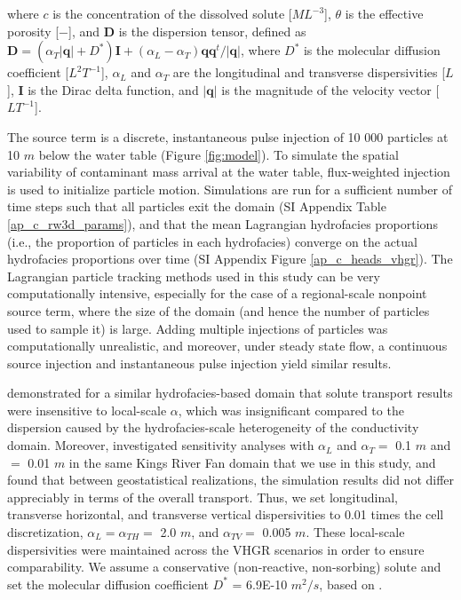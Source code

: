 where $c$ is the concentration of the dissolved solute [$ML^{-3}$], $\theta$ is the effective porosity [$-$], and $\textbf{D}$ is the dispersion tensor, defined as $\textbf{D} = (\alpha_T |\textbf{q}| + D^*) \textbf{I} + (\alpha_L - \alpha_T) \textbf{qq}^t / |\textbf{q}|$, where $D^*$ is the molecular diffusion coefficient [$L^2 T^{-1}$], $\alpha_L$ and $\alpha_T$ are the longitudinal and transverse dispersivities [$L$], $\textbf{I}$ is the Dirac delta function, and $|\textbf{q}|$ is the magnitude of the velocity vector [$LT^{-1}$].

The source term is a discrete, instantaneous pulse injection of 10 000 particles at 10 $m$ below the water table (Figure \ref{fig:model}). To simulate the spatial variability of contaminant mass arrival at the water table, flux-weighted injection is used to initialize particle motion. Simulations are run for a sufficient number of time steps such that all particles exit the domain (SI Appendix Table \ref{ap_c_rw3d_params}), and that the mean Lagrangian hydrofacies proportions (i.e., the proportion of particles in each hydrofacies) converge on the actual hydrofacies proportions over time (SI Appendix Figure \ref{ap_c_heads_vhgr}). The Lagrangian particle tracking methods used in this study can be very computationally intensive, especially for the case of a regional-scale nonpoint source term, where the size of the domain (and hence the number of particles used to sample it) is large. Adding multiple injections of particles was computationally unrealistic, and moreover, under steady state flow, a continuous source injection and instantaneous pulse injection yield similar results. %

\citet{labolle2001role} demonstrated for a similar hydrofacies-based domain that solute transport results were insensitive to local-scale $\alpha$, which was insignificant compared to the dispersion caused by the hydrofacies-scale heterogeneity of the conductivity domain. Moreover, \citet{weissmann2002dispersion} investigated sensitivity analyses with $\alpha_L$ and $\alpha_T =$ 0.1 $m$ and $=$ 0.01 $m$ in the same Kings River Fan domain that we use in this study, and found that between geostatistical realizations, the simulation results did not differ appreciably in terms of the overall transport. Thus, we set longitudinal, transverse horizontal, and transverse vertical dispersivities to 0.01 times the cell discretization, $\alpha_L = \alpha_{TH} = $ 2.0 $m$, and $\alpha_{TV} = $ 0.005 $m$. These local-scale dispersivities were maintained across the VHGR scenarios in order to ensure comparability. We assume a conservative (non-reactive, non-sorbing) solute and set the molecular diffusion coefficient $D^*$ = 6.9E-10 $m^2/s$, based on \citet{weissmann2002dispersion}. 

